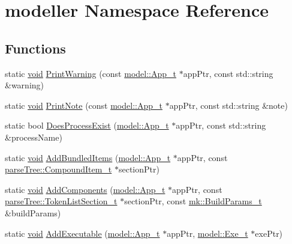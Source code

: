 \hypertarget{namespacemodeller}{}\section{modeller Namespace Reference}
\label{namespacemodeller}
\subsection*{Functions}
\begin{DoxyCompactItemize}
\item 
static \hyperlink{_t_e_m_p_l_a_t_e__cdef_8h_ac9c84fa68bbad002983e35ce3663c686}{void} \hyperlink{namespacemodeller_abc78e70e9b81a7094360dea5a8d58141}{Print\+Warning} (const \hyperlink{structmodel_1_1_app__t}{model\+::\+App\+\_\+t} $\ast$app\+Ptr, const std\+::string \&warning)
\item 
static \hyperlink{_t_e_m_p_l_a_t_e__cdef_8h_ac9c84fa68bbad002983e35ce3663c686}{void} \hyperlink{namespacemodeller_a58a4c43d0c7c945bed2674fa37c41a3b}{Print\+Note} (const \hyperlink{structmodel_1_1_app__t}{model\+::\+App\+\_\+t} $\ast$app\+Ptr, const std\+::string \&note)
\item 
static bool \hyperlink{namespacemodeller_ac2d22c597350ec2397aad7f24c737b4f}{Does\+Process\+Exist} (\hyperlink{structmodel_1_1_app__t}{model\+::\+App\+\_\+t} $\ast$app\+Ptr, const std\+::string \&process\+Name)
\item 
static \hyperlink{_t_e_m_p_l_a_t_e__cdef_8h_ac9c84fa68bbad002983e35ce3663c686}{void} \hyperlink{namespacemodeller_afdf979d941e366f63575ecce30b4065d}{Add\+Bundled\+Items} (\hyperlink{structmodel_1_1_app__t}{model\+::\+App\+\_\+t} $\ast$app\+Ptr, const \hyperlink{structparse_tree_1_1_compound_item__t}{parse\+Tree\+::\+Compound\+Item\+\_\+t} $\ast$section\+Ptr)
\item 
static \hyperlink{_t_e_m_p_l_a_t_e__cdef_8h_ac9c84fa68bbad002983e35ce3663c686}{void} \hyperlink{namespacemodeller_a2a8274869a54d32ec8273dedd4dad417}{Add\+Components} (\hyperlink{structmodel_1_1_app__t}{model\+::\+App\+\_\+t} $\ast$app\+Ptr, const \hyperlink{structparse_tree_1_1_token_list_section__t}{parse\+Tree\+::\+Token\+List\+Section\+\_\+t} $\ast$section\+Ptr, const \hyperlink{structmk_1_1_build_params__t}{mk\+::\+Build\+Params\+\_\+t} \&build\+Params)
\item 
static \hyperlink{_t_e_m_p_l_a_t_e__cdef_8h_ac9c84fa68bbad002983e35ce3663c686}{void} \hyperlink{namespacemodeller_a9b5c284d00fa1ca0d76f51df2e54c399}{Add\+Executable} (\hyperlink{structmodel_1_1_app__t}{model\+::\+App\+\_\+t} $\ast$app\+Ptr, \hyperlink{structmodel_1_1_exe__t}{model\+::\+Exe\+\_\+t} $\ast$exe\+Ptr)

\end{DoxyCompactItemize}
